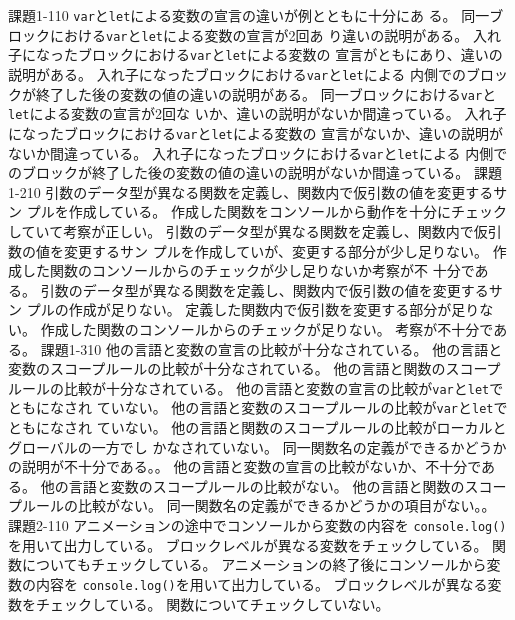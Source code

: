 \documentclass[a4j]{jreport}
\begin{document}
{
{課題1-1}{10}
{
  {\texttt{var}と\texttt{let}による変数の宣言の違いが例とともに十分にあ
  る。}
}
{
  {同一ブロックにおける\texttt{var}と\texttt{let}による変数の宣言が2回あ
  り違いの説明がある。}
  {入れ子になったブロックにおける\texttt{var}と\texttt{let}による変数の
  宣言がともにあり、違いの説明がある。}
  {入れ子になったブロックにおける\texttt{var}と\texttt{let}による
  内側でのブロックが終了した後の変数の値の違いの説明がある。}
}
{
  {同一ブロックにおける\texttt{var}と\texttt{let}による変数の宣言が2回な
  いか、違いの説明がないか間違っている。}
  {入れ子になったブロックにおける\texttt{var}と\texttt{let}による変数の
  宣言がないか、違いの説明がないか間違っている。}
  {入れ子になったブロックにおける\texttt{var}と\texttt{let}による
  内側でのブロックが終了した後の変数の値の違いの説明がないか間違っている。}
}
{\ResultA}
{課題1-2}{10}
{
  {引数のデータ型が異なる関数を定義し、関数内で仮引数の値を変更するサン
  プルを作成している。}
  {作成した関数をコンソールから動作を十分にチェックしていて考察が正しい。}
}
{
  {引数のデータ型が異なる関数を定義し、関数内で仮引数の値を変更するサン
  プルを作成していが、変更する部分が少し足りない。}
  {作成した関数のコンソールからのチェックが少し足りないか考察が不
  十分である。}
}
{
  {引数のデータ型が異なる関数を定義し、関数内で仮引数の値を変更するサン
  プルの作成が足りない。}
  {定義した関数内で仮引数を変更する部分が足りない。}
  {作成した関数のコンソールからのチェックが足りない。}
  {考察が不十分である。}
}
{\ResultA}
{課題1-3}{10}
{
  {他の言語と変数の宣言の比較が十分なされている。}
  {他の言語と変数のスコープルールの比較が十分なされている。}
  {他の言語と関数のスコープルールの比較が十分なされている。}
}
{
  {他の言語と変数の宣言の比較が\texttt{var}と\texttt{let}でともになされ
  ていない。}
  {他の言語と変数のスコープルールの比較が\texttt{var}と\texttt{let}でともになされ
  ていない。}
  {他の言語と関数のスコープルールの比較がローカルとグローバルの一方でし
  かなされていない。}
  {同一関数名の定義ができるかどうかの説明が不十分である。。}
}
{
  {他の言語と変数の宣言の比較がないか、不十分である。}
  {他の言語と変数のスコープルールの比較がない。}
  {他の言語と関数のスコープルールの比較がない。}
  {同一関数名の定義ができるかどうかの項目がない。。}
}
{\ResultEI}
{課題2-1}{10}
{
  {アニメーションの途中でコンソールから変数の内容を
  \texttt{console.log()}を用いて出力している。}
  {ブロックレベルが異なる変数をチェックしている。}
  {関数についてもチェックしている。}
}
{
  {アニメーションの終了後にコンソールから変数の内容を
  \texttt{console.log()}を用いて出力している。}
  {ブロックレベルが異なる変数をチェックしている。}
  {関数についてチェックしていない。}
}}
\end{document}
